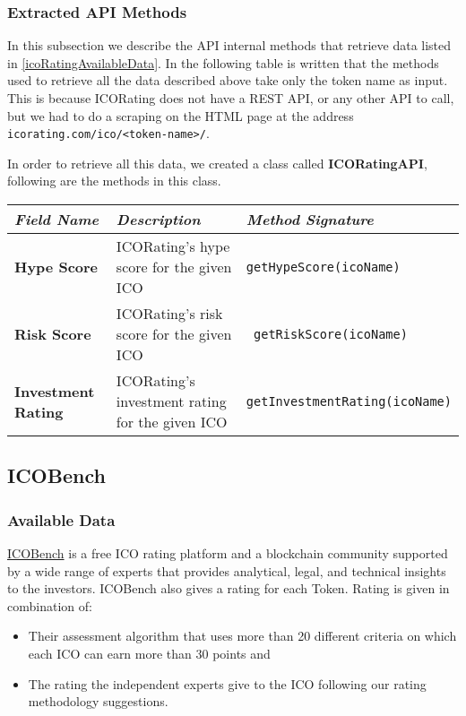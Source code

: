 \subsubsection{Extracted API Methods}
In this subsection we describe the API internal methods that retrieve data listed in \ref{icoRatingAvailableData}. \newline 
In the following table is written that the methods used to retrieve all the data described above take only the token name as input. \newline
This is because ICORating does not have a REST API, or any other API to call, but we had to do a scraping on the HTML page at the address \texttt{icorating.com/ico/<token-name>/}. \newline

In order to retrieve all this data, we created a class called \textbf{ICORatingAPI}, following are the methods in this class.
\begin{center}
\begin{tabular}{| C{2.5cm} | C{4cm} | C{5.5cm} |} \hline
    \textit{Field Name} & \textit{Description} & \textit{Method Signature}\\ \hline 
    \textbf{Hype Score} & ICORating's hype score for the given ICO & \texttt{getHypeScore(icoName)}\\ \hline 
    \textbf{Risk Score} & ICORating's risk score for the given ICO & \texttt{ getRiskScore(icoName)}\\ \hline 
    \textbf{Investment Rating} & ICORating's investment rating for the given ICO & \texttt{getInvestmentRating(icoName)}\\ \hline 
\end{tabular}
\end{center}

\subsection{ICOBench}
\label{icoBench}
\subsubsection{Available Data}
\href{https://icobench.com/}{ICOBench} is a free ICO rating platform and a blockchain community supported by a wide range of experts that provides analytical, legal, and technical insights to the investors.
ICOBench also gives a rating for each Token. Rating is given in combination of:
\begin{itemize}
    \item Their assessment algorithm that uses more than 20 different criteria on which each ICO can earn more than 30 points and
    \item The rating the independent experts give to the ICO following our rating methodology suggestions.
\end{itemize} 

